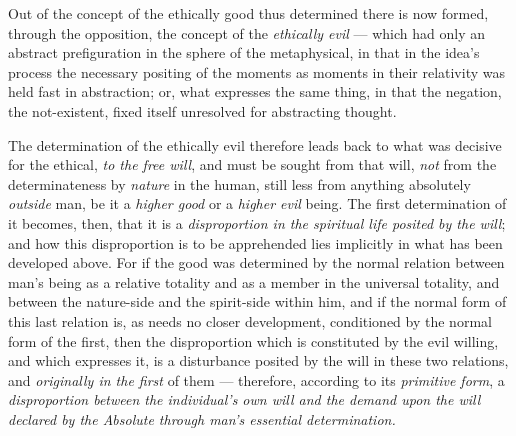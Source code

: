 \documentclass[12pt,a4paper]{book}
\begin{document}
Out of the concept of the ethically good thus determined there is now formed,
through the opposition, the concept of the \emph{ethically evil} --- which had
only an abstract prefiguration in the sphere of the metaphysical, in that in the
idea's process the necessary positing of the moments as moments in their
relativity was held fast in abstraction; or, what expresses the same thing, in
that the negation, the not-existent, fixed itself unresolved for abstracting
thought.

The determination of the ethically evil therefore leads back to what was
decisive for the ethical, \emph{to the free will}, and must be sought from that
will, \emph{not} from the determinateness by \emph{nature} in the human, still
less from anything absolutely \emph{outside} man, be it a \emph{higher good} or
a \emph{higher evil} being. The first determination of it becomes, then, that it
is a \emph{disproportion in the spiritual life posited by the will}; and how
this disproportion is to be apprehended lies implicitly in what has been
developed above. For if the good was determined by the normal relation between
man's being as a relative totality and as a member in the universal totality,
and between the nature-side and the spirit-side within him, and if the normal
form of this last relation is,
\setcounter{footnote}{0}%
as needs no closer development, conditioned by the normal form of the first,
then the disproportion which is constituted by the evil willing, and which
expresses it, is a disturbance posited by the will in these two relations, and
\emph{originally in the first} of them --- therefore, according to its
\emph{primitive form}, a \emph{disproportion between the individual's own will
and the demand upon the will declared by the Absolute through man's essential
determination.}
\end{document}
